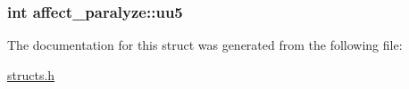 \hypertarget{structaffect__paralyze_aae65e45a3da12fcd435b53ea0af8d630}{
\subsubsection[{uu5}]{\setlength{\rightskip}{0pt plus 5cm}int affect\-\_\-paralyze\-::uu5}}\label{structaffect__paralyze_aae65e45a3da12fcd435b53ea0af8d630}


The documentation for this struct was generated from the following file\-:\begin{DoxyCompactItemize}
\item 
\hyperlink{structs_8h}{structs.\-h}\end{DoxyCompactItemize}
